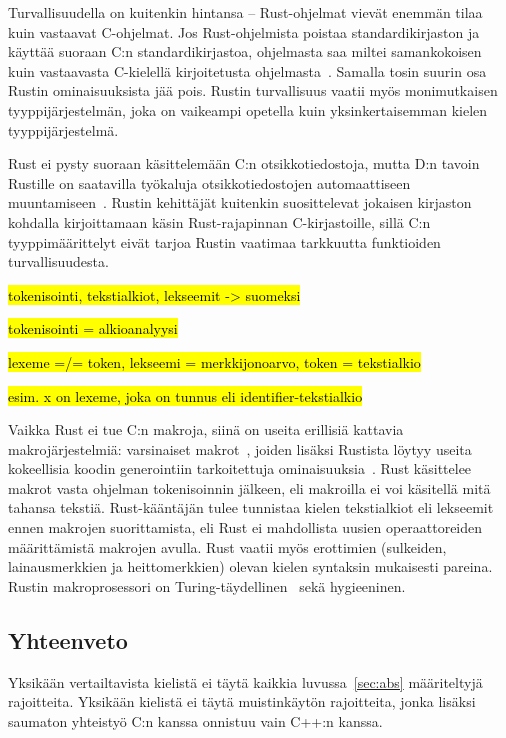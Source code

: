 Turvallisuudella on kuitenkin hintansa -- Rust-ohjelmat vievät enemmän tilaa
kuin vastaavat C-ohjelmat. Jos Rust-ohjelmista poistaa standardikirjaston ja
käyttää suoraan C:n standardikirjastoa, ohjelmasta saa miltei samankokoisen
kuin vastaavasta C-kielellä kirjoitetusta ohjelmasta~\citep{rustbinarysize}.
Samalla tosin suurin osa Rustin ominaisuuksista jää pois. Rustin turvallisuus
vaatii myös monimutkaisen tyyppijärjestelmän, joka on vaikeampi opetella kuin
yksinkertaisemman kielen tyyppijärjestelmä.

Rust ei pysty suoraan käsittelemään C:n otsikkotiedostoja, mutta D:n tavoin
Rustille on saatavilla työkaluja otsikkotiedostojen automaattiseen
muuntamiseen~\citep{rustbindgen}. Rustin kehittäjät kuitenkin suosittelevat
jokaisen kirjaston kohdalla kirjoittamaan käsin Rust-rajapinnan C-kirjastoille,
sillä C:n tyyppimäärittelyt eivät tarjoa Rustin vaatimaa tarkkuutta funktioiden
turvallisuudesta.

\hl{tokenisointi, tekstialkiot, lekseemit -> suomeksi}

\hl{tokenisointi = alkioanalyysi}

\hl{lexeme =/= token, lekseemi = merkkijonoarvo, token = tekstialkio}

\hl{esim. x on lexeme, joka on tunnus eli identifier-tekstialkio}

Vaikka Rust ei tue C:n makroja, siinä on useita erillisiä kattavia
makrojärjestelmiä: varsinaiset makrot~\citep{rustmacros}, joiden lisäksi
Rustista löytyy useita kokeellisia koodin generointiin tarkoitettuja
ominaisuuksia~\citep{rustprocmacros, rustplugins}. Rust käsittelee makrot
vasta ohjelman tokenisoinnin jälkeen, eli makroilla ei voi käsitellä mitä
tahansa tekstiä. Rust-kääntäjän tulee tunnistaa kielen tekstialkiot eli
lekseemit ennen makrojen suorittamista, eli Rust ei mahdollista
uusien operaattoreiden määrittämistä makrojen avulla. Rust vaatii myös
erottimien (sulkeiden, lainausmerkkien ja heittomerkkien) olevan kielen
syntaksin mukaisesti pareina. Rustin makroprosessori on
Turing-täydellinen~\citep{rustmacros} sekä hygieeninen.

\newpage

\subsection{Yhteenveto}

Yksikään vertailtavista kielistä ei täytä kaikkia luvussa~\ref{sec:abs}
määriteltyjä rajoitteita. Yksikään kielistä ei täytä muistinkäytön rajoitteita,
jonka lisäksi saumaton yhteistyö C:n kanssa onnistuu vain C++:n kanssa.

